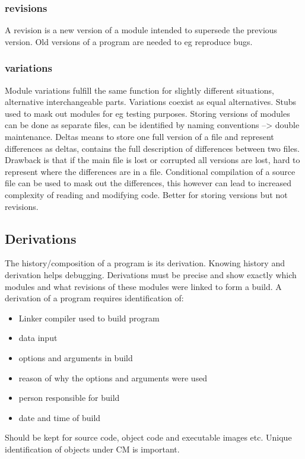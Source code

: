\subsubsection{revisions}
A revision is a new version of a module intended to supersede the previous version. Old versions of a program are needed to eg reproduce bugs.

\subsubsection{variations}
Module variations fulfill the same function for slightly different situations, alternative interchangeable parts. Variations coexist as equal alternatives. Stubs used to mask out modules for eg testing purposes.
Storing versions of modules can be done as separate files, can be identified by naming conventions --> double maintenance. Deltas means to store one full version of a file and represent differences as deltas, contains the full description of differences between two files. Drawback is that if the main file is lost or corrupted all versions are lost, hard to represent where the differences are in a file.
Conditional compilation of a source file can be used to mask out the differences, this however can lead to increased complexity of reading and modifying code. Better for storing versions but not revisions.

\subsection{Derivations}
The history/composition of a program is its derivation. Knowing history and derivation helps debugging. Derivations must be precise and show exactly which modules and what revisions of these modules were linked to form a build. A derivation of a program requires identification of:

\begin{itemize}
    \item Linker compiler used to build program
    \item data input
    \item options and arguments in build
    \item reason of why the options and arguments were used
    \item person responsible for build
    \item date and time of build
\end{itemize}
Should be kept for source code, object code and executable images etc.
Unique identification of objects under CM is important.

